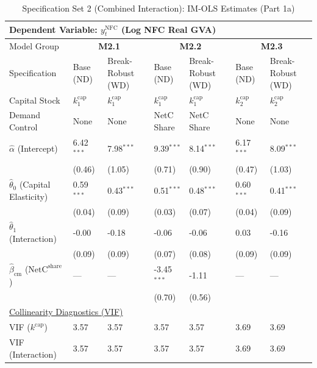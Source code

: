 \begin{table}[H]
\centering
\caption{Specification Set 2 (Combined Interaction): IM-OLS Estimates (Part 1a)}
\label{tab:spec_set_2_p1a}
\scriptsize
\begin{tabular}{p{3.8cm}p{2.1cm}p{2.1cm}p{2.1cm}p{2.1cm}p{2.1cm}p{2.1cm}}
\toprule
\multicolumn{7}{l}{\textbf{Dependent Variable: $y_t^{\text{NFC}}$ (Log NFC Real GVA)}} \\
\midrule
Model Group & \multicolumn{2}{c}{\textbf{M2.1}} & \multicolumn{2}{c}{\textbf{M2.2}} & \multicolumn{2}{c}{\textbf{M2.3}}  \\
Specification & Base (ND) & Break-Robust (WD) & Base (ND) & Break-Robust (WD) & Base (ND) & Break-Robust (WD)  \\
Capital Stock & $k^{\text{cap}}_1$ & $k^{\text{cap}}_1$ & $k^{\text{cap}}_1$ & $k^{\text{cap}}_1$ & $k^{\text{cap}}_2$ & $k^{\text{cap}}_2$  \\
Demand Control & None & None & NetC Share & NetC Share & None & None  \\
\midrule
$\hat{\alpha}$ (Intercept)  & 6.42$^{***}$ & 7.98$^{***}$ & 9.39$^{***}$ & 8.14$^{***}$ & 6.17$^{***}$ & 8.09$^{***}$  \\
 & {\scriptsize (0.46)} & {\scriptsize (1.05)} & {\scriptsize (0.71)} & {\scriptsize (0.90)} & {\scriptsize (0.47)} & {\scriptsize (1.03)}  \\
[1ex]
$\hat{\theta}_0$ (Capital Elasticity)  & 0.59$^{***}$ & 0.43$^{***}$ & 0.51$^{***}$ & 0.48$^{***}$ & 0.60$^{***}$ & 0.41$^{***}$  \\
 & {\scriptsize (0.04)} & {\scriptsize (0.09)} & {\scriptsize (0.03)} & {\scriptsize (0.07)} & {\scriptsize (0.04)} & {\scriptsize (0.09)}  \\
$\hat{\theta}_1$ (Interaction)  & -0.00 & -0.18 & -0.06 & -0.06 & 0.03 & -0.16  \\
 & {\scriptsize (0.09)} & {\scriptsize (0.09)} & {\scriptsize (0.07)} & {\scriptsize (0.08)} & {\scriptsize (0.09)} & {\scriptsize (0.09)}  \\
$\hat{\beta}_{\text{cm}}$ ($\text{NetC}^{\text{share}}$)  & --- & --- & -3.45$^{***}$ & -1.11 & --- & ---  \\
 &  &  & {\scriptsize (0.70)} & {\scriptsize (0.56)} &  &   \\
\midrule
\multicolumn{7}{l}{\underline{Collinearity Diagnostics (VIF)}} \\
VIF ($k^{\text{cap}}$) & 3.57 & 3.57 & 3.57 & 3.57 & 3.69 & 3.69  \\
VIF (Interaction) & 3.57 & 3.57 & 3.57 & 3.57 & 3.69 & 3.69  \\

\end{tabular}
\end{table}
